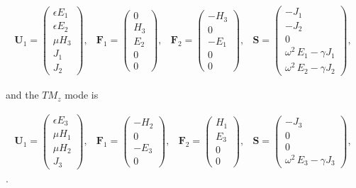 \begin{equation*}
\begin{array}{ccccc}
\mathbf{U}_1 = \begin{pmatrix} \epsilon E_1 \\ \epsilon E_2 \\ \mu H_3 \\ J_1 \\  J_2 \end{pmatrix} ,
&
\mathbf{F}_1 = \begin{pmatrix} 0 \\ H_3 \\ E_2 \\ 0 \\  0 \end{pmatrix} ,
&
\mathbf{F}_2 = \begin{pmatrix} - H_3 \\ 0 \\ -E_1 \\ 0 \\ 0 \end{pmatrix} ,
&
\mathbf{S} = \begin{pmatrix} - J_1 \\ - J_2 \\ 0 \\ \omega^2 \, E_1 - \gamma J_1 \\  \omega^2 \, E_2 - \gamma J_2 \end{pmatrix} ,
\end{array}
\:
\end{equation*}

and the $TM_z$ mode is

\begin{equation*}
\begin{array}{ccccc}
\mathbf{U}_1 = \begin{pmatrix} \epsilon E_3 \\ \mu H_1 \\ \mu H_2 \\ J_3 \end{pmatrix} ,
&
\mathbf{F}_1 = \begin{pmatrix} -H_2 \\ 0 \\ -E_3 \\ 0 \end{pmatrix} ,
&
\mathbf{F}_2 = \begin{pmatrix} H_1 \\ E_3 \\ 0 \\ 0 \end{pmatrix} ,
&
\mathbf{S} = \begin{pmatrix} - J_3 \\ 0 \\ 0 \\ \omega^2 \, E_3 - \gamma J_3 \end{pmatrix} ,
\end{array}
\:
\end{equation*}
.

